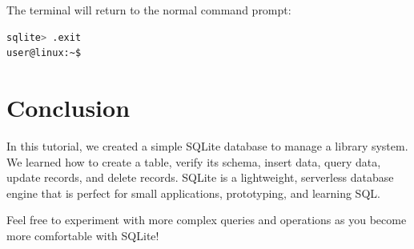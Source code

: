 \documentclass{article}
\begin{document}
The terminal will return to the normal command prompt:

\begin{lstlisting}[language=bash]
sqlite> .exit
user@linux:~$
\end{lstlisting}

\section*{Conclusion}

In this tutorial, we created a simple SQLite database to manage a library system. We learned how to create a table, verify its schema, insert data, query data, update records, and delete records. SQLite is a lightweight, serverless database engine that is perfect for small applications, prototyping, and learning SQL.

Feel free to experiment with more complex queries and operations as you become more comfortable with SQLite!
\end{document}
